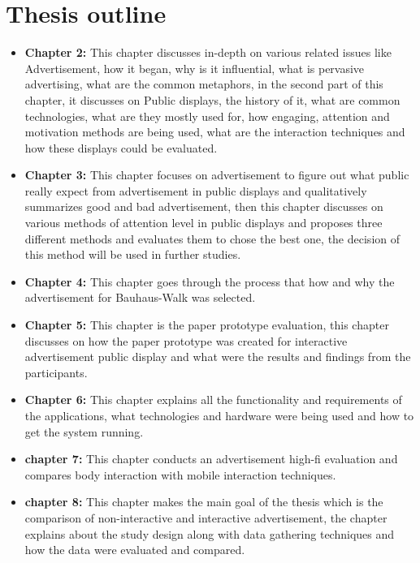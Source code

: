 \section{Thesis outline}
\begin{itemize}

\item \textbf{Chapter 2:}
 This chapter discusses in-depth on various related issues like Advertisement, how it began, why is it influential, what is pervasive advertising, what are the common metaphors, in the second part of this chapter, it discusses on Public displays, the history of it, what are common technologies, what are they mostly used for, how engaging, attention and motivation methods are being used, what are the interaction techniques and how these displays could be evaluated.


\item \textbf{Chapter 3:}
This chapter focuses on advertisement to figure out what public really expect from advertisement in public displays and qualitatively summarizes good and bad advertisement, then this chapter discusses on various methods of attention level in public displays and proposes three different methods and evaluates them to chose the best one, the decision of this method will be used in further studies.


\item \textbf{Chapter 4:}
This chapter goes through the process that how and why the advertisement for Bauhaus-Walk was selected.


\item \textbf{Chapter 5:}
This chapter is the paper prototype evaluation, this chapter discusses on how the paper prototype was created for interactive advertisement public display and what were the results and findings from the participants. 


\item \textbf{Chapter 6:}
This chapter explains all the functionality and requirements of the applications, what technologies and hardware were being used and how to get the system running.


\item \textbf{chapter 7:}
This chapter conducts an advertisement high-fi evaluation and compares body interaction with mobile interaction techniques.


\item \textbf{chapter 8:}
This chapter makes the main goal of the thesis which is the comparison of non-interactive and interactive advertisement, the chapter explains about the study design along with data gathering techniques and how the data were evaluated and compared.



\end{itemize}
